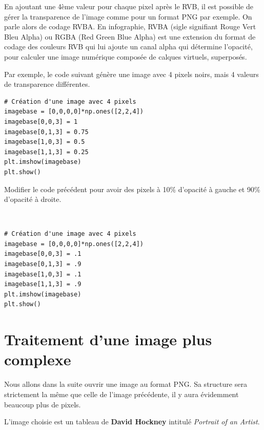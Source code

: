 En ajoutant une 4ème valeur pour chaque pixel après le RVB, il est possible de gérer la transparence de l'image comme pour un format PNG par exemple. On parle alors de codage RVBA. En infographie, RVBA (sigle signifiant Rouge Vert Bleu Alpha) ou RGBA (Red Green Blue Alpha) est une extension du format de codage des couleurs RVB qui lui ajoute un canal alpha qui détermine l’opacité, pour calculer une image numérique composée de calques virtuels, superposés. 

Par exemple, le code suivant génère une image avec 4 pixels noirs, mais 4 valeurs de transparence différentes.

\begin{verbatim}
# Création d'une image avec 4 pixels
imagebase = [0,0,0,0]*np.ones([2,2,4])
imagebase[0,0,3] = 1
imagebase[0,1,3] = 0.75
imagebase[1,0,3] = 0.5
imagebase[1,1,3] = 0.25
plt.imshow(imagebase)
plt.show()
\end{verbatim}   

\begin{exercice}
Modifier le code précédent pour avoir des pixels à 10\% d'opacité à gauche et 90\% d'opacité à droite.
\end{exercice}

\begin{solution}~\\
\vspace{-0.7cm}
\begin{verbatim}
# Création d'une image avec 4 pixels
imagebase = [0,0,0,0]*np.ones([2,2,4])
imagebase[0,0,3] = .1
imagebase[0,1,3] = .9
imagebase[1,0,3] = .1
imagebase[1,1,3] = .9
plt.imshow(imagebase)
plt.show()
\end{verbatim} 
\end{solution}

\section{Traitement d'une image plus complexe}

Nous allons dans la suite ouvrir une image au format PNG. Sa structure sera strictement la même que celle de l'image précédente, il y aura évidemment beaucoup plus de pixels.

L'image choisie est un tableau de \textbf{David Hockney} intitulé \textit{Portrait of an Artist}.


